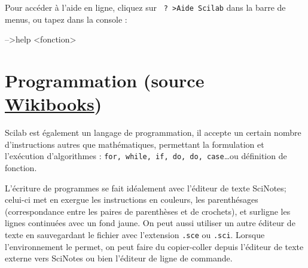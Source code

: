 Pour accéder à l'aide en ligne, cliquez sur \verb/ ? >Aide Scilab/ 
dans la barre de menus, ou tapez   dans la console :
\begin{Scilabcode}
-->help <fonction>
\end{Scilabcode}
\section[Programmation]
        {Programmation (source 
        \href{https://fr.wikibooks.org/wiki/Découvrir_Scilab}{Wikibooks}) }
Scilab est également un langage de programmation, il accepte un certain nombre 
d'instructions autres que mathématiques, permettant la formulation et 
l'exécution d'algorithmes : \verb?for, while, if, do, do, case?\ldots ou 
définition de fonction.

L'écriture de programmes se fait idéalement avec l'éditeur de 
texte SciNotes; celui-ci met en exergue les instructions en couleurs, 
les parenthésages (correspondance entre les paires de parenthèses 
et de crochets), et surligne les lignes continuées avec un fond jaune. 
On peut aussi utiliser un autre éditeur de texte en sauvegardant le fichier 
avec l'extension \verb?.sce? ou \verb?.sci?. Lorsque l'environnement le permet,
on peut faire du copier-coller depuis l'éditeur de texte externe vers SciNotes 
ou bien l'éditeur de ligne de commande.
